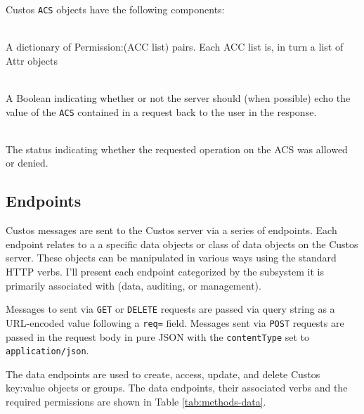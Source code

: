 \noindent
Custos \texttt{ACS} objects have the following components:

\begin{packed_desc}
\item[\texttt{Permissions}] \hfill \\ A dictionary of Permission:(ACC
  list) pairs. Each ACC list is, in turn a list of Attr objects
\item[\texttt{Echo}] \hfill \\ A Boolean indicating whether or not the
  server should (when possible) echo the value of the \texttt{ACS}
  contained in a request back to the user in the response.
\item[\texttt{Status} (Response Only)] \hfill \\ The status indicating
  whether the requested operation on the ACS was allowed or denied.
\end{packed_desc}

\subsection{Endpoints}

Custos messages are sent to the Custos server via a series of
endpoints. Each endpoint relates to a a specific data objects or class
of data objects on the Custos server. These objects can be manipulated
in various ways using the standard HTTP verbs. I'll present each
endpoint categorized by the subsystem it is primarily associated with
(data, auditing, or management).

Messages to sent via \texttt{GET} or \texttt{DELETE} requests are
passed via query string as a URL-encoded value following a
\texttt{req=} field. Messages sent via \texttt{POST} requests are
passed in the request body in pure JSON with the \texttt{contentType}
set to \texttt{application/json}.

The data endpoints are used to create, access, update, and delete
Custos key:value objects or groups. The data endpoints, their
associated verbs and the required permissions are shown in Table
\ref{tab:methods-data}.

